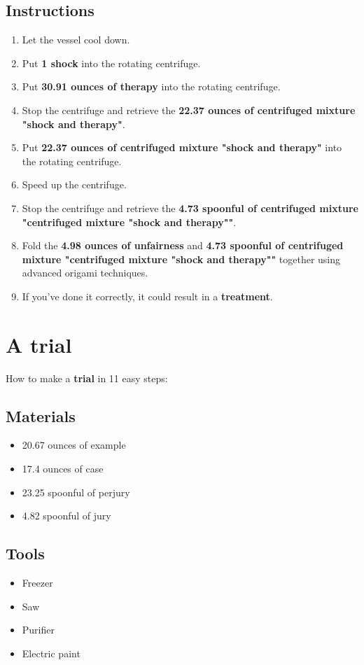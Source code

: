 \documentclass{article}
\begin{document}
\subsection{Instructions}\begin{enumerate}
\item 
Let the vessel cool down.
\item 
Put \textbf{1 shock} into the rotating centrifuge.
\item 
Put \textbf{30.91 ounces of therapy} into the rotating centrifuge.
\item 
Stop the centrifuge and retrieve the \textbf{22.37 ounces of centrifuged mixture "shock and therapy"}.
\item 
Put \textbf{22.37 ounces of centrifuged mixture "shock and therapy"} into the rotating centrifuge.
\item 
Speed up the centrifuge.
\item 
Stop the centrifuge and retrieve the \textbf{4.73 spoonful of centrifuged mixture "centrifuged mixture "shock and therapy""}.
\item 
Fold the \textbf{4.98 ounces of unfairness} and \textbf{4.73 spoonful of centrifuged mixture "centrifuged mixture "shock and therapy""} together using advanced origami techniques.
\item 
If you've done it correctly, it could result in a \textbf{treatment}.
\end{enumerate}
\newpage
\section{A trial}How to make a \textbf{trial} in 11 easy steps:

\subsection{Materials}\begin{itemize}
\item 
20.67 ounces of example
\item 
17.4 ounces of case
\item 
23.25 spoonful of perjury
\item 
4.82 spoonful of jury
\end{itemize}
\subsection{Tools}\begin{itemize}
\item 
Freezer
\item 
Saw
\item 
Purifier
\item 
Electric paint
\end{itemize}
\end{document}
